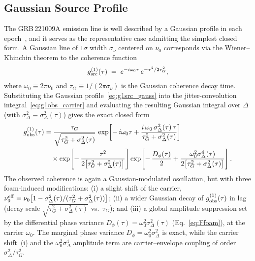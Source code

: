 \documentclass[aps,prd,onecolumn,amsmath,amssymb]{revtex4-2}
\begin{document}
\subsection{Gaussian Source Profile}
\label{sec:closedforms}

The GRB\,221009A emission line is well described by a Gaussian profile
in each epoch~\cite{YQZhang2024}, and it serves as the representative
case admitting the simplest closed form.
A Gaussian line of $1\sigma$ width $\sigma_\nu$ centered on $\nu_0$
corresponds via the Wiener--Khinchin theorem to the coherence function
\begin{equation}
  g^{(1)}_{\rm src}(\tau) \;=\; e^{-i\omega_0\tau}\,e^{-\tau^2/2\tau_G^2},
  \label{eq:g1src_gauss}
\end{equation}
where $\omega_0 \equiv 2\pi\nu_0$ and $\tau_G \equiv 1/(2\pi\sigma_\nu)$ is the
Gaussian coherence decay time.
Substituting the Gaussian profile~\eqref{eq:g1src_gauss} into the
jitter-convolution integral~\eqref{eq:g1obs_carrier} and evaluating the
resulting Gaussian integral over $\Delta$ (with
$\sigma_\Delta^2\equiv\sigma_\Delta^2(\tau)$) gives the exact closed form
\begin{align}
  g^{(1)}_{\rm obs}(\tau)
  &= \frac{\tau_G}{\sqrt{\tau_G^2+\sigma_\Delta^2(\tau)}}\,
     \exp\!\left[-\,i\omega_0\tau
       +\frac{i\,\omega_0\,\sigma_\Delta^2(\tau)\,\tau}
              {\tau_G^2+\sigma_\Delta^2(\tau)}\right] \notag\\
  &\quad\times \exp\!\left[-\,\frac{\tau^2}
       {2\bigl[\tau_G^2+\sigma_\Delta^2(\tau)\bigr]}\right]
     \exp\!\left[-\,\frac{D_\phi(\tau)}{2}
       +\frac{\omega_0^2\sigma_\Delta^4(\tau)}
              {2\bigl[\tau_G^2+\sigma_\Delta^2(\tau)\bigr]}\right].
  \label{eq:g1obs_gauss}
\end{align}
The observed coherence is again a Gaussian-modulated oscillation, but
with three foam-induced modifications: (i) a slight shift of the carrier,
$\nu_0^{\rm eff} = \nu_0\bigl[1-
\sigma_\Delta^2(\tau)/(\tau_G^2+\sigma_\Delta^2(\tau))\bigr]$;
(ii) a wider Gaussian decay of $g^{(1)}_{\rm obs}(\tau)$ in lag (decay
scale $\sqrt{\tau_G^2+\sigma_\Delta^2(\tau)}$ vs.\ $\tau_G$);
and (iii) a global amplitude suppression set by the differential phase
variance $D_\phi(\tau)=\omega_0^2\sigma_\Delta^2(\tau)$ (Eq.~\eqref{eq:Ffoam}),
at the carrier $\omega_0$.  The marginal phase variance $D_\phi=\omega_0^2\sigma_\Delta^2$ is exact,
while the carrier shift~(i) and the $\omega_0^2\sigma_\Delta^4$ amplitude
term are carrier--envelope coupling of order $\sigma_\Delta^2/\tau_G^2$.
\end{document}
